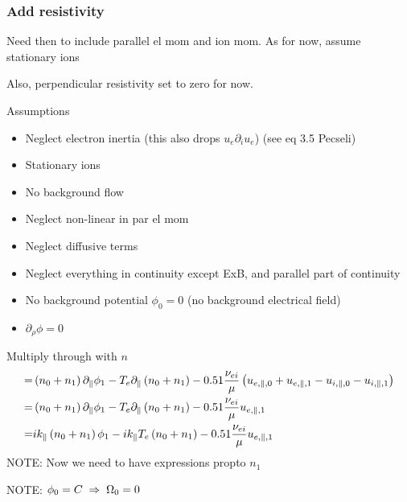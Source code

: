 \subsubsection{Add resistivity}
Need then to include parallel el mom and ion mom. As for now, assume stationary ions

Also, perpendicular resistivity set to zero for now.

Assumptions
%
\begin{itemize}
    \item Neglect electron inertia (this also drops $u_e \partial_i u_e$) (see eq 3.5 Pecseli)
    \item Stationary ions
    \item No background flow
    \item Neglect non-linear in par el mom
    \item Neglect diffusive terms
    \item Neglect everything in continuity except ExB, and parallel part of continuity
    \item No background potential $\phi_0 = 0$ (no background electrical field)
    \item $\partial_\rho\phi = 0$
\end{itemize}
%
Multiply through with $n$
%
\begin{align*}
%
=&
\L( n_0 + n_1\R)\partial_\| \phi_1
-
T_e \partial_\| \L( n_0 + n_1 \R)
  - 0.51 \frac{\nu_{ei}}{\mu }
  \L( u_{e,\|,0} + u_{e,\|,1} - u_{i,\|,0} - u_{i,\|,1} \R)
  \\
=&
\L( n_0 + n_1\R)\partial_\| \phi_1
-
T_e \partial_\| \L( n_0 + n_1 \R)
  - 0.51 \frac{\nu_{ei}}{\mu } u_{e,\|,1}
  \\
=&
ik_\|\L( n_0 + n_1\R) \phi_1
-
ik_\|T_e \L( n_0 + n_1 \R)
  - 0.51 \frac{\nu_{ei}}{\mu }  u_{e,\|,1}
\end{align*}
%
NOTE: Now we need to have expressions propto $n_1$

NOTE: $\phi_0=C \; \Rightarrow \; \Omega_0 = 0$

